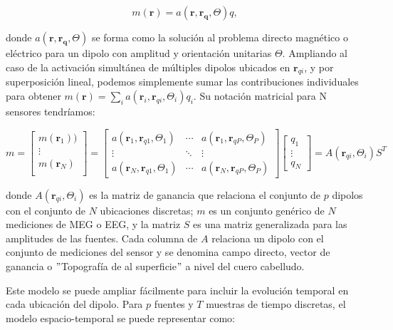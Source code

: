 \documentclass[11pt,letterpaper]{article}
\numberwithin{equation}{subsection}
\numberwithin{table}{subsection}
\begin{document}
\begin{equation}
m(\mathbf{r}) = a(\mathbf{r},\mathbf{r}_\mathbf{q},\Theta)q,
\end{equation}

\smallskip
\noindent donde $a(\mathbf{r},\mathbf{r}_\mathbf{q},\Theta)$ se forma como la solución al problema directo magnético o eléctrico para un dipolo con amplitud y orientación unitarias $\Theta$. Ampliando al caso de la activación simultánea de múltiples dipolos ubicados en $\mathbf{r}_{qi}$, y por superposición lineal, podemos simplemente sumar las contribuciones individuales para obtener $m(\mathbf{r}) = \sum_i a(\mathbf{r}_i,\mathbf{r}_{qi},\Theta_i)q_i$. Su notación matricial para N sensores tendríamos:

\begin{equation}
m=
\begin{bmatrix}
m(\mathbf{r}_1))\\ 
\vdots \\ 
m(\mathbf{r}_N)\\
\end{bmatrix}
= \begin{bmatrix}
a(\mathbf{r}_1,\mathbf{r}_{q1}, \Theta_1)& \cdots  & a(\mathbf{r}_1,\mathbf{r}_{qP}, \Theta_P) \\ 
\vdots  & \ddots  & \vdots  \\ 
 a(\mathbf{r}_N,\mathbf{r}_{q1}, \Theta_1)& \cdots  & a(\mathbf{r}_N,\mathbf{r}_{qP}, \Theta_P) 
\end{bmatrix}
\begin{bmatrix}
q_1\\ 
\vdots \\ 
q_N
\end{bmatrix}
= A(\mathbf{r}_{qi},\Theta_i )S^T
\end{equation}

\smallskip
\noindent donde $A(\mathbf{r}_{qi},\Theta_i )$ es la matriz de ganancia que relaciona el conjunto de $p$ dipolos con el conjunto de $N$ ubicaciones discretas; $m$ es un conjunto genérico de $N$ mediciones de MEG o EEG, y la matriz $S$ es una matriz generalizada para las amplitudes de las fuentes. Cada columna de $A$ relaciona un dipolo con el conjunto de mediciones del sensor y se denomina campo directo, vector de ganancia o $"$Topografía de al superficie$"$ a nivel del cuero cabelludo.

\bigskip
\noindent Este modelo se puede ampliar fácilmente para incluir la evolución temporal en cada ubicación del dipolo. Para $p$ fuentes y $T$ muestras de tiempo discretas, el modelo espacio-temporal se puede representar como:
\end{document}
